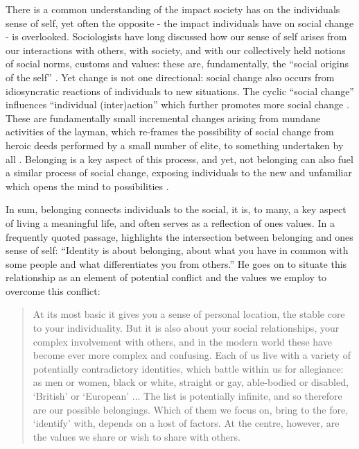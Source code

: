 There is a common understanding of the impact society has on the individuals sense of self, yet often the opposite - the impact individuals have on social change - is overlooked. Sociologists have long discussed how our sense of self arises from our interactions with others, with society, and with our collectively held notions of social norms, customs and values: these are, fundamentally, the “social origins of the self” \citep[][p368]{May2011}. Yet change is not one directional: social change also occurs from idiosyncratic reactions of individuals to new situations. The cyclic “social change” influences “individual (inter)action” which further promotes more social change \citep[][p367]{May2011}. These are fundamentally small incremental changes arising from mundane activities of the layman, which re-frames the possibility of social change from heroic deeds performed by a small number of elite, to something undertaken by all \citep{May2011}. Belonging is a key aspect of this process, and yet, not belonging can also fuel a similar process of social change, exposing individuals to the new and unfamiliar which opens the mind to possibilities \cite{May2011}.

In sum, belonging connects individuals to the social, it is, to many, a key aspect of living a meaningful life, and often serves as a reflection of ones values. In a frequently quoted passage, \citet[][p88]{Weeks1990} highlights the intersection between belonging and ones sense of self: “Identity is about belonging, about what you have in common with some people and what differentiates you from others.” He goes on to situate this relationship as an element of potential conflict and the values we employ to overcome this conflict: 
\begin{quote}At its most basic it gives you a sense of personal location, the stable core to your individuality. But it is also about your social relationships, your complex involvement with others, and in the modern world these have become ever more complex and confusing. Each of us live with a variety of potentially contradictory identities, which battle within us for allegiance: as men or women, black or white, straight or gay, able-bodied or disabled, `British' or `European' ... The list is potentially infinite, and so therefore are our possible belongings. Which of them we focus on, bring to the fore, `identify' with, depends on a host of factors. At the centre, however, are the values we share or wish to share with others. \end{quote}





